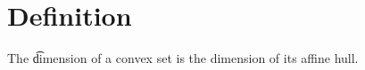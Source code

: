 

\section*{Definition}

The \t{dimension} of a convex set is the dimension of its affine hull.

\blankpage